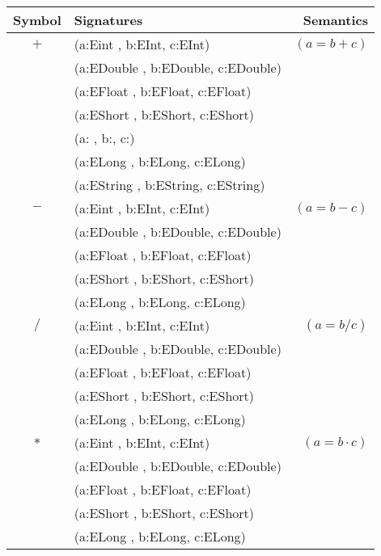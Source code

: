  \begin{table}[h]
\begin{center}
 \begin{tabular}{| c| l | r |} \hline 
Symbol & Signatures  & Semantics \\ \hline \hline  
$+$ & (a:Eint , b:EInt, c:EInt) & $(a=b+c)$ \\ 
 & (a:EDouble , b:EDouble, c:EDouble) & \\ 
 & (a:EFloat , b:EFloat, c:EFloat) &  \\ 
 & (a:EShort , b:EShort, c:EShort) & \\ 
 & (a: , b:, c:) & \\
 & (a:ELong , b:ELong, c:ELong) &  \\ 
 & (a:EString , b:EString, c:EString) & \\\hline
$-$ & (a:Eint , b:EInt, c:EInt) & $(a=b-c)$ \\ 
 & (a:EDouble , b:EDouble, c:EDouble) & \\ 
 & (a:EFloat , b:EFloat, c:EFloat) &  \\ 
 & (a:EShort , b:EShort, c:EShort) & \\ 
 & (a:ELong , b:ELong, c:ELong) &  \\ \hline
$ /$ & (a:Eint , b:EInt, c:EInt) & $(a=b/c)$ \\ 
 & (a:EDouble , b:EDouble, c:EDouble) & \\ 
 & (a:EFloat , b:EFloat, c:EFloat) &  \\ 
 & (a:EShort , b:EShort, c:EShort) & \\ 
 & (a:ELong , b:ELong, c:ELong) &  \\ \hline
$ *$ & (a:Eint , b:EInt, c:EInt) & $(a=b\cdot c)$ \\ 
 & (a:EDouble , b:EDouble, c:EDouble) & \\ 
 & (a:EFloat , b:EFloat, c:EFloat) &  \\ 
 & (a:EShort , b:EShort, c:EShort) & \\ 
 & (a:ELong , b:ELong, c:ELong) &  \\ \hline
  \end{tabular}
  \end{center}
 \end{table} 





   
